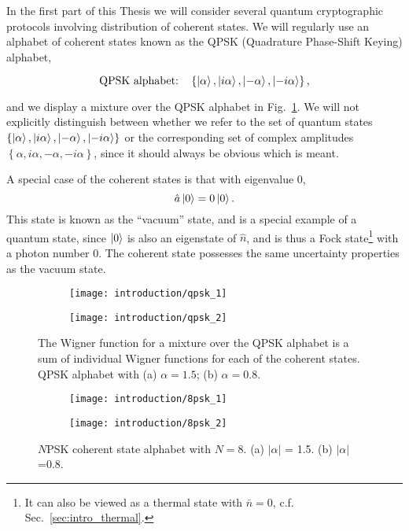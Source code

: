 \noindent In the first part of this Thesis we will consider several quantum cryptographic protocols involving distribution of coherent states. We will regularly use an alphabet of coherent states known as the QPSK (Quadrature Phase-Shift Keying) alphabet, 

\begin{equation}
\qq*{QPSK alphabet:} \left\{\ket{\alpha}, \ket{i \alpha}, \ket{- \alpha}, \ket{- i \alpha}\right\},
\end{equation}

\noindent and we display a mixture over the QPSK alphabet in Fig.~\ref{fig:qpsk}. We will not explicitly distinguish between whether we refer to the set of quantum states $\left\{\ket{\alpha}, \ket{i \alpha}, \ket{- \alpha}, \ket{- i \alpha}\right\}$ or the corresponding set of complex amplitudes $\left\{ \alpha, i \alpha, -\alpha, - i\alpha\right\}$, since it should always be obvious which is meant.

A special case of the coherent states is that with eigenvalue $0$,
\begin{equation}
\hat{a} \ket{0} = 0 \ket{0}.
\end{equation}
\noindent This state is known as the ``vacuum'' state, and is a special example of a quantum state, since $\ket{0}$ is also an eigenstate of $\hat{n}$, and is thus a Fock state\footnote{It can also be viewed as a thermal state with $\bar{n}=0$, c.f. Sec.~\ref{sec:intro_thermal}.} with a photon number $0$. The coherent state possesses the same uncertainty properties as the vacuum state.


\begin{figure}[htp]
\captionsetup{width=0.8\linewidth}
\centering
\begin{subfigure}[b]{0.49\linewidth}
\texttt{[image: introduction/qpsk\_1]}
\caption{}
\end{subfigure}
\begin{subfigure}[b]{0.49\linewidth}
\texttt{[image: introduction/qpsk\_2]}
\caption{}
\end{subfigure}
\caption{\label{fig:qpsk} The Wigner function for a mixture over the QPSK alphabet is a sum of individual Wigner functions for each of the coherent states. QPSK alphabet with (a) $\alpha=1.5$; (b) $\alpha=0.8$.}
\end{figure}

\begin{figure}[htp]
\captionsetup{width=0.8\linewidth}
\centering
\begin{subfigure}[b]{0.49\linewidth}
\texttt{[image: introduction/8psk\_1]}
\caption{}
\end{subfigure}
\begin{subfigure}[b]{0.49\linewidth}
\texttt{[image: introduction/8psk\_2]}
\caption{}
\end{subfigure}
\caption{\label{fig:intro_npsk} $N$PSK coherent state alphabet with $N=8$. (a) $\left|\alpha\right|$ = 1.5. (b) $\left|\alpha\right|$=0.8.}
\end{figure}

